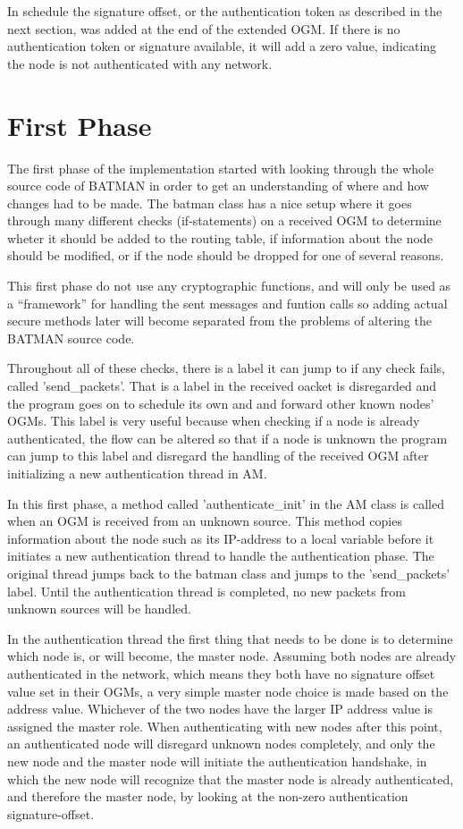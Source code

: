 In schedule the signature offset, or the authentication token as described in
the next section, was added at the end of the extended \ac{OGM}. If there is no
authentication token or signature available, it will add a zero value,
indicating the node is not authenticated with any network.

\section{First Phase}
The first phase of the implementation started with looking through the whole
source code of BATMAN in order to get an understanding of where and how changes
had to be made. The batman class has a nice setup where it goes through many
different checks (if-statements) on a received \ac{OGM} to determine wheter it
should be added to the routing table, if information about the node should be
modified, or if the node should be dropped for one of several reasons.

This first phase do not use any cryptographic functions, and will only be used
as a ``framework'' for handling the sent messages and funtion calls so adding
actual secure methods later will become separated from the problems of altering
the BATMAN source code.

Throughout all of these checks, there is a label it can jump to if any check
fails, called 'send\_packets'. That is a label in the received oacket is
disregarded and the program goes on to schedule its own and and forward other
known nodes' \acp{OGM}. This label is very useful because when checking if a
node is already authenticated, the flow can be altered so that if a node is
unknown the program can jump to this label and disregard the handling of the
received \ac{OGM} after initializing a new authentication thread in \ac{AM}.

In this first phase, a method called 'authenticate\_init' in the \ac{AM} class
is called when an \ac{OGM} is received from an unknown source. This method
copies information about the node such as its IP-address to a local variable
before it initiates a new authentication thread to handle the authentication
phase. The original thread jumps back to the batman class and jumps to the
'send\_packets' label. Until the authentication thread is completed, no new
packets from unknown sources will be handled.

In the authentication thread the first thing that needs to be done is to
determine which node is, or will become, the master node. Assuming both nodes
are already authenticated in the network, which means they both have no
signature offset value set in their \acp{OGM}, a very simple master node choice
is made based on the address value. Whichever of the two nodes have the larger
IP address value is assigned the master role. When authenticating with new nodes
after this point, an authenticated node will disregard unknown nodes
completely, and only the new node and the master node will initiate
the authentication handshake, in which the new node will recognize that the
master node is already authenticated, and therefore the master node, by looking
at the non-zero authentication signature-offset.


